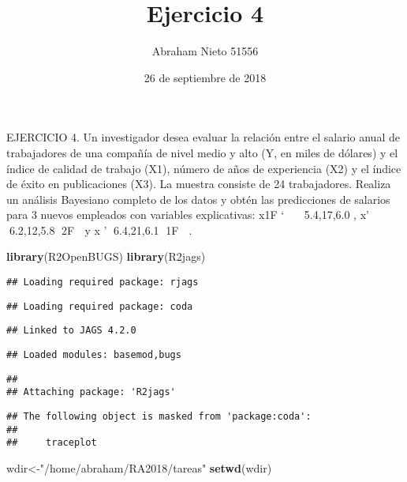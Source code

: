 \documentclass[]{article}
\title{Ejercicio 4}
\author{Abraham Nieto 51556}
\date{26 de septiembre de 2018}
\newenvironment{Shaded}{\begin{snugshade}}{\end{snugshade}}
\newcommand{\KeywordTok}[1]{\textcolor[rgb]{0.13,0.29,0.53}{\textbf{#1}}}
\newcommand{\StringTok}[1]{\textcolor[rgb]{0.31,0.60,0.02}{#1}}
\newcommand{\NormalTok}[1]{#1}
\begin{document}
\maketitle

EJERCICIO 4. Un investigador desea evaluar la relación entre el salario
anual de trabajadores de una compañía de nivel medio y alto (Y, en miles
de dólares) y el índice de calidad de trabajo (X1), número de años de
experiencia (X2) y el índice de éxito en publicaciones (X3). La muestra
consiste de 24 trabajadores. Realiza un análisis Bayesiano completo de
los datos y obtén las predicciones de salarios para 3 nuevos empleados
con variables explicativas: x1F `   5.4,17,6.0 , x' 6.2,12,5.8 2F 
y x ' 6.4,21,6.1 1F  .

\begin{Shaded}
\begin{Highlighting}[]
\KeywordTok{library}\NormalTok{(R2OpenBUGS)}
\KeywordTok{library}\NormalTok{(R2jags)}
\end{Highlighting}
\end{Shaded}

\begin{verbatim}
## Loading required package: rjags
\end{verbatim}

\begin{verbatim}
## Loading required package: coda
\end{verbatim}

\begin{verbatim}
## Linked to JAGS 4.2.0
\end{verbatim}

\begin{verbatim}
## Loaded modules: basemod,bugs
\end{verbatim}

\begin{verbatim}
## 
## Attaching package: 'R2jags'
\end{verbatim}

\begin{verbatim}
## The following object is masked from 'package:coda':
## 
##     traceplot
\end{verbatim}

\begin{Shaded}
\begin{Highlighting}[]
\NormalTok{wdir<-}\StringTok{"/home/abraham/RA2018/tareas"}
\KeywordTok{setwd}\NormalTok{(wdir)}
\end{Highlighting}
\end{Shaded}
\end{document}
